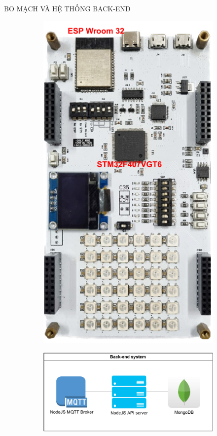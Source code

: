 \begin{frame}{BO MẠCH VÀ HỆ THỐNG BACK-END}
\begin{figure}
	\centering
	\subfigure
	{
		\begin{minipage}{0.2\linewidth}
    		\begin{figure}
    			\centering
    			\includegraphics[scale=0.5]{pic/Presentation-Page-4-Bo-mach.pdf}
    		\end{figure}
    	\end{minipage}
	}
	\subfigure
	{
		\begin{minipage}{0.7\linewidth}
    		\begin{figure}
				\raggedleft
    			\includegraphics[scale=.6]{pic/Presentation-Page-5-Back-end-system.pdf}
    		\end{figure}
    	\end{minipage}
	}
\end{figure}
   
    
\end{frame}